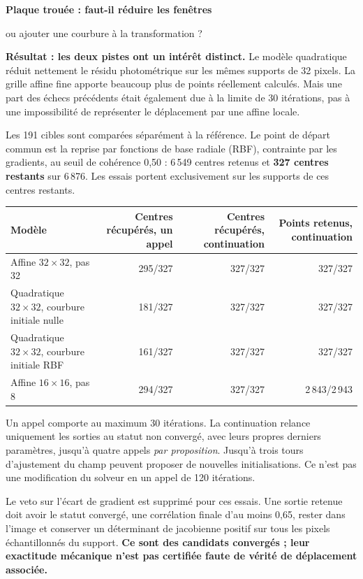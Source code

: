 \documentclass[11pt,a4paper,landscape]{article}
\begin{document}
{\LARGE\bfseries Plaque trouée : faut-il réduire les fenêtres\par
ou ajouter une courbure à la transformation ?\par}
\vspace{4mm}
\textbf{Résultat : les deux pistes ont un intérêt distinct.} Le modèle quadratique
réduit nettement le résidu photométrique sur les mêmes supports de 32 pixels. La grille
affine fine apporte beaucoup plus de points réellement calculés. Mais une part des
échecs précédents était également due à la limite de 30 itérations, pas à une impossibilité
de représenter le déplacement par une affine locale.

Les 191 cibles sont comparées séparément à la référence. Le point de départ commun
est la reprise par fonctions de base radiale (RBF), contrainte par les gradients,
au seuil de cohérence 0,50 : 6\,549 centres retenus et \textbf{327 centres restants} sur 6\,876.
Les essais portent exclusivement sur les supports de ces centres restants.

\begin{center}\begin{tabular}{lrrr}
\toprule
Modèle & Centres récupérés, un appel & Centres récupérés, continuation & Points retenus, continuation\\\midrule
Affine $32\times32$, pas 32 &295/327&327/327&327/327\\
Quadratique $32\times32$, courbure initiale nulle &181/327&327/327&327/327\\
Quadratique $32\times32$, courbure initiale RBF &161/327&327/327&327/327\\
Affine $16\times16$, pas 8 &294/327&327/327&2\,843/2\,943\\\bottomrule
\end{tabular}\end{center}

Un appel comporte au maximum 30 itérations. La continuation relance uniquement les
sorties au statut non convergé, avec leurs propres derniers paramètres, jusqu'à quatre
appels \emph{par proposition}. Jusqu'à trois tours d'ajustement du champ peuvent proposer
de nouvelles initialisations. Ce n'est pas une modification du solveur en un appel de 120 itérations.

Le veto sur l'écart de gradient est supprimé pour ces essais. Une sortie retenue doit
avoir le statut convergé, une corrélation finale d'au moins 0,65, rester dans l'image
et conserver un déterminant de jacobienne positif sur tous les pixels échantillonnés
du support. \textbf{Ce sont des candidats convergés ; leur exactitude mécanique n'est pas
certifiée faute de vérité de déplacement associée.}
\end{document}
